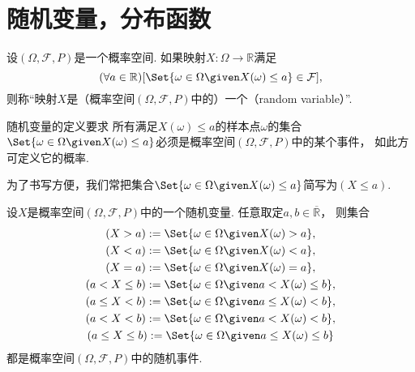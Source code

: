 \section{随机变量，分布函数}
\begin{definition}
设\((\Omega,\mathcal{F},P)\)是一个概率空间.
如果映射\(X\colon \Omega \to \mathbb{R}\)满足\begin{equation*}
	(\forall a \in \mathbb{R})
	[
		\Set{
			\omega \in \Omega
			\given
			X(\omega) \leq a
		}
		\in \mathcal{F}
	],
\end{equation*}
则称“映射\(X\)是（概率空间\((\Omega,\mathcal{F},P)\)中的）一个（random variable）”.
\end{definition}
\begin{remark}
随机变量的定义要求
所有满足\(X(\omega) \leq a\)的样本点\(\omega\)的集合\(
	\Set{
		\omega \in \Omega
		\given
		X(\omega) \leq a
	}
\)必须是概率空间\((\Omega,\mathcal{F},P)\)中的某个事件，
如此方可定义它的概率.
\end{remark}
\begin{remark}
为了书写方便，我们常把集合\(
	\Set{
		\omega \in \Omega
		\given
		X(\omega) \leq a
	}
\)简写为\((X \leq a)\).
\end{remark}

\begin{theorem}
设\(X\)是概率空间\((\Omega,\mathcal{F},P)\)中的一个随机变量.
任意取定\(a,b \in \overline{\mathbb{R}}\)，
则集合\begin{gather*}
	(X > a)
	\defeq
	\Set{
		\omega \in \Omega
		\given
		X(\omega) > a
	}, \\
	(X < a)
	\defeq
	\Set{
		\omega \in \Omega
		\given
		X(\omega) < a
	}, \\
	(X = a)
	\defeq
	\Set{
		\omega \in \Omega
		\given
		X(\omega) = a
	}, \\
	(a < X \leq b)
	\defeq
	\Set{
		\omega \in \Omega
		\given
		a < X(\omega) \leq b
	}, \\
	(a \leq X < b)
	\defeq
	\Set{
		\omega \in \Omega
		\given
		a \leq X(\omega) < b
	}, \\
	(a < X < b)
	\defeq
	\Set{
		\omega \in \Omega
		\given
		a < X(\omega) < b
	}, \\
	(a \leq X \leq b)
	\defeq
	\Set{
		\omega \in \Omega
		\given
		a \leq X(\omega) \leq b
	}
\end{gather*}
都是概率空间\((\Omega,\mathcal{F},P)\)中的随机事件.
\end{theorem}

